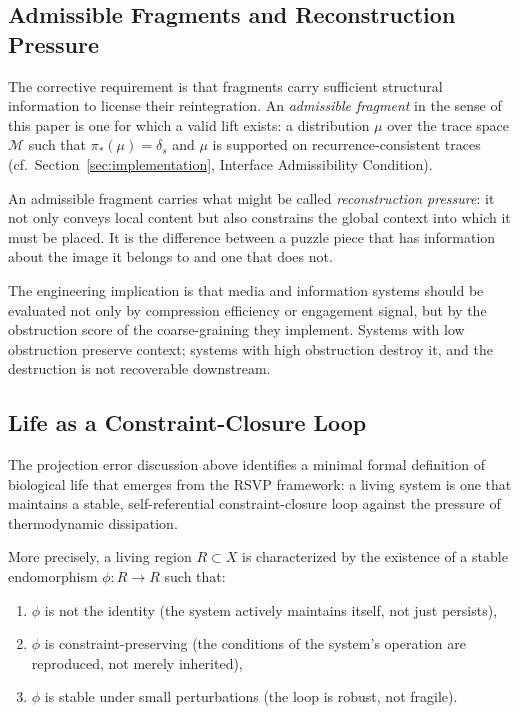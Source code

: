\documentclass[12pt,a4paper]{article}
\begin{document}
\subsection{Admissible Fragments and Reconstruction Pressure}

The corrective requirement is that fragments carry sufficient structural information to license their reintegration. An \emph{admissible fragment} in the sense of this paper is one for which a valid lift exists: a distribution $\mu$ over the trace space $\mathcal{M}$ such that $\pi_*(\mu) = \delta_s$ and $\mu$ is supported on recurrence-consistent traces (cf.\ Section~\ref{sec:implementation}, Interface Admissibility Condition).

An admissible fragment carries what might be called \emph{reconstruction pressure}: it not only conveys local content but also constrains the global context into which it must be placed. It is the difference between a puzzle piece that has information about the image it belongs to and one that does not.

The engineering implication is that media and information systems should be evaluated not only by compression efficiency or engagement signal, but by the obstruction score of the coarse-graining they implement. Systems with low obstruction preserve context; systems with high obstruction destroy it, and the destruction is not recoverable downstream.

\subsection{Life as a Constraint-Closure Loop}

The projection error discussion above identifies a minimal formal definition of biological life that emerges from the RSVP framework: a living system is one that maintains a stable, self-referential constraint-closure loop against the pressure of thermodynamic dissipation.

More precisely, a living region $R \subset X$ is characterized by the existence of a stable endomorphism $\phi : R \to R$ such that:
\begin{enumerate}[noitemsep]
\item $\phi$ is not the identity (the system actively maintains itself, not just persists),
\item $\phi$ is constraint-preserving (the conditions of the system's operation are reproduced, not merely inherited),
\item $\phi$ is stable under small perturbations (the loop is robust, not fragile).
\end{enumerate}
\end{document}
